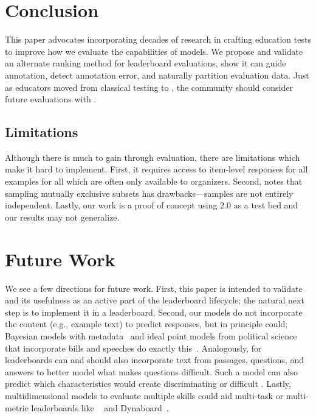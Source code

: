 \section{Conclusion}
\label{ch:isicle:conc}

This paper advocates incorporating decades of research in crafting education tests to improve how we evaluate the capabilities of  models.
%
We propose and validate an alternate \irt{} ranking method for leaderboard evaluations, show it can guide annotation, detect annotation error, and naturally partition evaluation data.
%
Just as educators moved from classical testing to \irt{}, the \nlp{} community should consider future evaluations with \irt{}.


\subsection{Limitations}
Although there is much to gain through \irt{} evaluation, there are limitations which make it hard to implement.
First, it requires access to item-level responses for all examples for all \subjs{} which are often only available to organizers.
Second, \citet{urbano2016reliability} notes that sampling mutually exclusive subsets has drawbacks---samples are not entirely independent.
Lastly, our work is a proof of concept using \squad{} 2.0 as a test bed and our results may not generalize.

\section{Future Work}
\label{ch:isicle:future}

We see a few directions for future work.
First, this paper is intended to validate \irt{} and its usefulness as an active part of the leaderboard lifecycle; the natural next step is to implement it in a leaderboard.
Second, our \irt{} models do not incorporate the \itm{} content (e.g., example text) to predict responses, but in principle could; Bayesian models with metadata~\citep{card2018meta} and ideal point models from political science~\citep{poole1985spatial} that incorporate bills and speeches do exactly this~\citep{gerrish2011text,nguyen2015tea,kraft2016vote}.
%
Analogously, \irt{} for leaderboards can and should also incorporate text from passages, questions, and answers to better model what makes questions difficult.
Such a model can also predict which characteristics would create discriminating or difficult \itms{}.
Lastly, multidimensional \irt{} models to evaluate multiple skills could aid multi-task or multi-metric leaderboards like ~\citep{fisch2019mrqa} and Dynaboard~\citep{ma2021dynaboard}.

